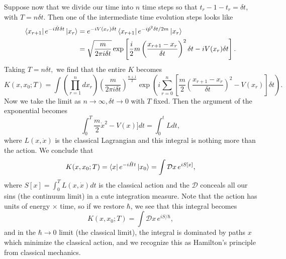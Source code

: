 Suppose now that we divide our time into $n$ time steps so that $t_r-1-t_r=\delta t$, with $T=n\delta t$. Then one of the intermediate time evolution steps looks like
\begin{align*}
    \left< x_{r+1} \right| e^{-i\hat H \delta t}\left| x_r \right>
        &= e^{-iV(x_r)\delta t} \left< x_{r+1} \right| e^{-i\hat p^2 \delta t/2m} \left| x_r \right>\\
        &= \sqrt{\frac{m}{2\pi i \delta t}} \exp\left[\frac{i}{2} m\left(\frac{x_{r+1}-x_r}{\delta t}\right)^2 \delta t - i V(x_r)\delta t\right].
\end{align*}
Taking $T=n\delta t,$ we find that the entire $K$ becomes
\begin{equation}
    K(x,x_0; T) =\int \left( \prod^n_{r=1} dx_r\right) \left(\frac{m}{2\pi i \delta t}\right)^{\frac{n+1}{2}} \exp \left( i\sum_{r=0}^n \left[\frac{m}{2}\left(\frac{x_{r+1}-x_r}{\delta t}\right)^2 -V(x_r)\right]\delta t\right).
\end{equation}
Now we take the limit as $n\to \infty, \delta t\to 0$ with $T$ fixed. Then the argument of the exponential becomes
\begin{equation}
    \int_0^T \frac{m}{2} \dot x^2 - V(x)] dt = \int_0^t L dt,
\end{equation}
where $L(x,\dot x)$ is the classical Lagrangian and this integral is nothing more than the action. We conclude that
\begin{equation}
    K(x,x_0;T) = \left< x \right| e^{-i\hat H t}\left| x_0 \right> = \int \mathcal{D}x\, e^{iS[x]},
\end{equation}
where $S[x]=\int_0^T L(x, \dot x) dt$ is the classical action and the $\mathcal{D}$ conceals all our sins (the continuum limit) in a cute integration measure. Note that the action has units of energy $\times$ time, so if we restore $\hbar$, we see that this integral becomes
\begin{equation}
    K(x,x_0 ; T) = \int \mathcal{D}x\, e^{iS/\hbar},
\end{equation}
and in the $\hbar \to 0$ limit (the classical limit), the integral is dominated by paths $x$ which minimize the classical action, and we recognize this as Hamilton's principle from classical mechanics.